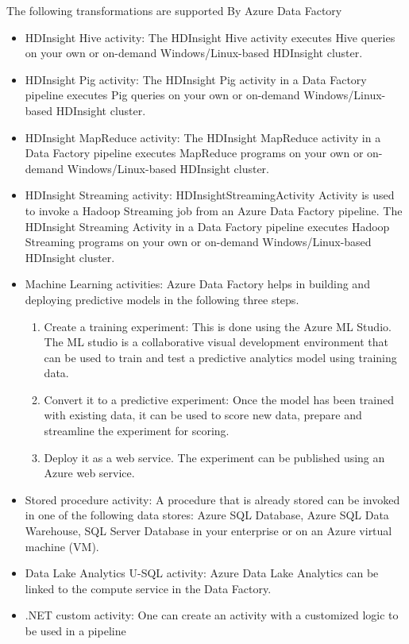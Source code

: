 \documentclass[9pt,twocolumn,twoside]{styles/osajnl}
\begin{document}
The following transformations are supported By Azure Data Factory~\cite{www-microsoft-azure-transform}
\begin{itemize}
    \item HDInsight Hive activity: The HDInsight Hive activity executes Hive queries on your own or on-demand Windows/Linux-based HDInsight cluster.~\cite{www-microsoft-azure-hive}
    \item HDInsight Pig activity: The HDInsight Pig activity in a Data Factory pipeline executes Pig queries on your own or on-demand Windows/Linux-based HDInsight cluster.~\cite{www-microsoft-azure-pig}
    \item HDInsight MapReduce activity: The HDInsight MapReduce activity in a Data Factory pipeline executes MapReduce programs on your own or on-demand Windows/Linux-based HDInsight cluster.~\cite{www-microsoft-azure-map}
    \item HDInsight Streaming activity: HDInsightStreamingActivity Activity is used to invoke a Hadoop Streaming job from an Azure Data Factory pipeline. The HDInsight Streaming Activity in a Data Factory pipeline executes Hadoop Streaming programs on your own or on-demand Windows/Linux-based HDInsight cluster.~\cite{www-microsoft-azure-hsa}
    \item Machine Learning activities: Azure Data Factory helps in building and deploying predictive models in the following three steps.~\cite{www-microsoft-azure-ml}
    \begin{enumerate}
        \item Create a training experiment: This is done using the Azure ML Studio. The ML studio is a collaborative visual development environment that can be used to train and test a predictive analytics model using training data.
        \item Convert it to a predictive experiment: Once the model has been trained with existing data, it can be used to score new data, prepare and streamline the experiment for scoring.
        \item Deploy it as a web service. The experiment can be published using an Azure web service. 
    \end{enumerate}
    \item Stored procedure activity: A procedure that is already stored can be invoked in one of the following data stores:  Azure SQL Database, Azure SQL Data Warehouse, SQL Server Database in your enterprise or on an Azure virtual machine (VM).~\cite{www-microsoft-azure-stored} 
    \item Data Lake Analytics U-SQL activity: Azure Data Lake Analytics can be linked to the compute service in the Data Factory. ~\cite{www-microsoft-azure-datalake}
    \item .NET custom activity: One can create an activity with a customized logic to be used in a pipeline ~\cite{www-microsoft-azure-dotnet}
\end{itemize}
\end{document}
